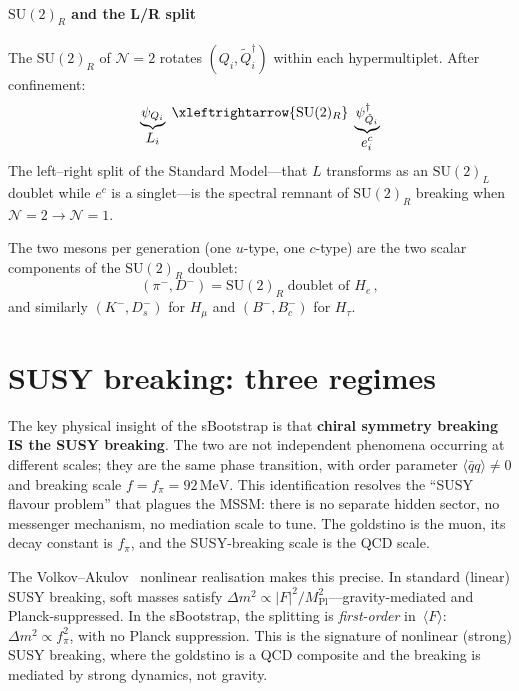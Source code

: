 \documentclass[aps,prd,twocolumn,showpacs,preprintnumbers,superscriptaddress]{revtex4-2}
\newcommand{\SU}{\mathrm{SU}}
\newcommand{\MeV}{\,\mathrm{MeV}}
\begin{document}
\paragraph{$\SU(2)_R$ and the L/R split}

The $\SU(2)_R$ of $\mathcal{N}{=}2$ rotates
$(Q_i, \tilde Q_i^\dagger)$ within each hypermultiplet.
After confinement:
\begin{equation}
  \underbrace{\psi_{Q_i}}_{\displaystyle L_i}
  \;\xleftrightarrow{\SU(2)_R}\;
  \underbrace{\psi_{\tilde Q_i}^\dagger}_{\displaystyle e_i^c}
  \label{eq:SU2R}
\end{equation}
The left--right split of the Standard Model---that $L$
transforms as an $\SU(2)_L$ doublet while $e^c$ is a
singlet---is the spectral remnant of $\SU(2)_R$ breaking
when $\mathcal{N}{=}2 \to \mathcal{N}{=}1$.

The two mesons per generation (one $u$-type, one $c$-type)
are the two scalar components of the $\SU(2)_R$ doublet:
\begin{equation}
  (\pi^-, D^-) = \SU(2)_R\;\text{doublet of }H_e\,,
  \label{eq:doublet}
\end{equation}
and similarly $(K^-, D_s^-)$ for $H_\mu$ and
$(B^-, B_c^-)$ for $H_\tau$.

\section{SUSY breaking: three regimes}
\label{sec:breaking}

The key physical insight of the sBootstrap is that
\textbf{chiral symmetry breaking IS the SUSY breaking}.
The two are not independent phenomena occurring at different
scales; they are the same phase transition, with order
parameter $\langle\bar q q\rangle \neq 0$ and breaking
scale $f = f_\pi = 92\MeV$.
This identification resolves the ``SUSY flavour problem''
that plagues the MSSM: there is no separate hidden sector,
no messenger mechanism, no mediation scale to tune.
The goldstino is the muon, its decay constant is $f_\pi$,
and the SUSY-breaking scale is the QCD scale.

The Volkov--Akulov~\cite{VolkovAkulov:1973} nonlinear
realisation makes this precise.
In standard (linear) SUSY breaking, soft masses satisfy
$\Delta m^2 \propto |F|^2/M_{\mathrm{Pl}}^2$---gravity-mediated
and Planck-suppressed.
In the sBootstrap, the splitting is \emph{first-order}
in~$\langle F\rangle$: $\Delta m^2 \propto f_\pi^2$, with
no Planck suppression.
This is the signature of nonlinear (strong) SUSY breaking,
where the goldstino is a QCD composite and the breaking
is mediated by strong dynamics, not gravity.
\end{document}
